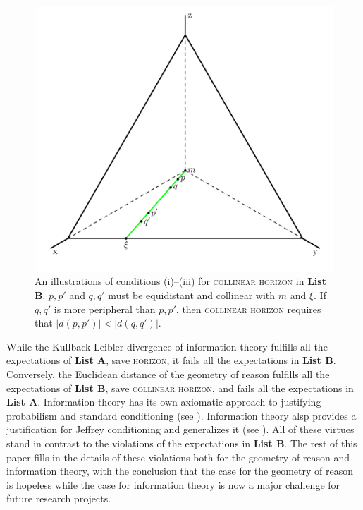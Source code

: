 \documentclass[smallextended]{svjour3}       %
\begin{document}
\begin{figure}[ht]
  \begin{flushright}
    \begin{minipage}[h]{.7\linewidth}
      \includegraphics[width=\textwidth]{horeff.eps}
      \caption{\footnotesize An illustrations of conditions (i)--(iii)
        for \textsc{collinear horizon} in \textbf{List B}. $p,p'$ and $q,q'$
        must be equidistant and collinear with $m$ and $\xi$. If
        $q,q'$ is more peripheral than $p,p'$, then \textsc{collinear
          horizon} requires that $|d(p,p')|<|d(q,q')|$.}
      \label{fig:conditions}
    \end{minipage}
  \end{flushright}
\end{figure}

While the Kullback-Leibler divergence of information theory fulfills
all the expectations of \textbf{List A}, save \textsc{horizon}, it
fails all the expectations in \textbf{List B}. Conversely, the
Euclidean distance of the geometry of reason fulfills all the
expectations of \textbf{List B}, save \textsc{collinear horizon}, and
fails all the expectations in \textbf{List A}. Information theory has
its own axiomatic approach to justifying probabilism and standard
conditioning (see ). Information theory
alsp provides a justification for Jeffrey conditioning and generalizes
it (see ). All of these virtues stand in contrast
to the violations of the expectations in \textbf{List B}. The rest of
this paper fills in the details of these violations both for the
geometry of reason and information theory, with the conclusion that
the case for the geometry of reason is hopeless while the case for
information theory is now a major challenge for future research
projects.
\end{document}

